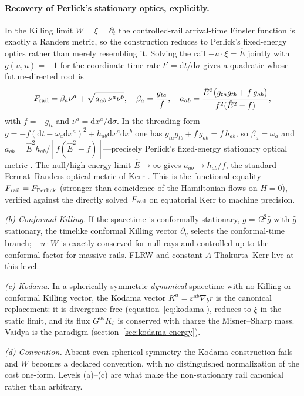 \documentclass[12pt]{iopart}
\newcommand{\Ehat}{\hat E}
\newcommand{\dd}{\mathrm{d}}
\theoremstyle{plain}
\theoremstyle{definition}
\theoremstyle{plain}
\theoremstyle{remark}
\begin{document}
\paragraph{Recovery of Perlick's stationary optics, explicitly.} In the Killing limit
$W=\xi=\partial_t$ the controlled-rail arrival-time Finsler function is exactly a
Randers metric, so the construction reduces to Perlick's fixed-energy optics rather
than merely resembling it. Solving the rail $-u\cdot\xi=\Ehat$ jointly with
$g(u,u)=-1$ for the coordinate-time rate $t'=\dd t/\dd\sigma$ gives a quadratic whose
future-directed root is
\begin{equation}
F_{\rm rail}=\beta_a \nu^a+\sqrt{a_{ab}\,\nu^a \nu^b},\quad
\beta_a=\frac{g_{ta}}{f},\quad
a_{ab}=\frac{\Ehat^2\bigl(g_{ta}g_{tb}+f\,g_{ab}\bigr)}{f^2(\Ehat^2-f)},
\label{eq:perlick-randers}
\end{equation}
with $f=-g_{tt}$ and $\nu^a=\dd x^a/\dd\sigma$. In the threading form
$g=-f(\dd t-\omega_a\dd x^a)^2+h_{ab}\dd x^a\dd x^b$ one has
$g_{ta}g_{tb}+f\,g_{ab}=f\,h_{ab}$, so $\beta_a=\omega_a$ and
$a_{ab}=\Ehat^2 h_{ab}/[f(\Ehat^2-f)]$---precisely Perlick's fixed-energy stationary
optical metric \cite{Perlick1991}. The null/high-energy limit $\Ehat\to\infty$ gives
$a_{ab}\to h_{ab}/f$, the standard Fermat--Randers optical metric of Kerr
\cite{GibbonsWerner2008}. This is the functional equality $F_{\rm rail}=F_{\rm Perlick}$
(stronger than coincidence of the Hamiltonian flows on $H=0$), verified against the
directly solved $F_{\rm rail}$ on equatorial Kerr to machine precision.

\emph{(b) Conformal Killing.} If the spacetime is conformally stationary,
$g=\Omega^2\hat g$ with $\hat g$ stationary, the timelike conformal Killing
vector $\partial_\eta$ selects the conformal-time branch; $-u\cdot W$ is exactly
conserved for null rays and controlled up to the conformal factor for massive
rails. FLRW and constant-$A$ Thakurta--Kerr live at this level.

\emph{(c) Kodama.} In a spherically symmetric \emph{dynamical} spacetime with no
Killing or conformal Killing vector, the Kodama vector
$K^a=\varepsilon^{ab}\nabla_b r$ \cite{Kodama1980,Hayward1996} is the canonical
replacement: it is divergence-free (equation~\eqref{eq:kodama}), reduces to $\xi$ in
the static limit, and its flux $G^{ab}K_b$ is conserved with charge the
Misner--Sharp mass. Vaidya is the paradigm (section~\ref{sec:kodama-energy}).

\emph{(d) Convention.} Absent even spherical symmetry the Kodama construction
fails and $W$ becomes a declared convention, with no distinguished normalization
of the cost one-form. Levels (a)--(c) are what make the non-stationary rail
canonical rather than arbitrary.
\end{document}
